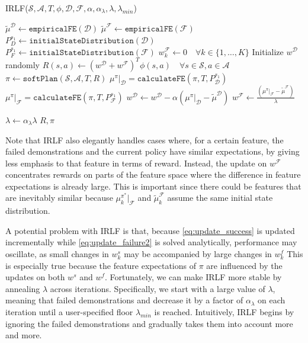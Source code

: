 \documentclass[letterpaper]{article}
\newcommand{\sw}[1]{\textcolor{red}{SW: #1}}
\newcommand{\jm}[1]{\textcolor{blue}{Joao: #1}}
\newcommand{\ks}[1]{\textcolor{green}{Kyriacos: #1}}
\newcommand{\sw}[1]{}
\newcommand{\jm}[1]{}
\newcommand{\ks}[1]{}
\begin{document}
\begin{algorithm}
\caption{IRLF($\mathcal{S},\mathcal{A},T, \phi, \mathcal{D}, \mathcal{F}, \alpha, \alpha_{\lambda}, \lambda, \lambda_{min}$) }
\label{alg:lff}
\begin{algorithmic}[1]
\STATE $\widetilde{\mu}^{\mathcal{D}} \gets \mathtt{empiricalFE}(\mathcal{D})$\hfill {}
\STATE $\widetilde{\mu}^{\mathcal{F}} \gets \mathtt{empiricalFE}(\mathcal{F})$ 
\STATE $P_{D}^{s_1} \gets \mathtt{initialStateDistribution}(\mathcal{D})$
\STATE $P_{F}^{s_1} \gets \mathtt{initialStateDistribution}(\mathcal{F})$
\STATE $w^{\mathcal{F}}_k\gets 0\quad\forall k\in\{1,\ldots,K\}$
\STATE Initialize $w^{\mathcal{D}}$ randomly
\REPEAT
\STATE $R(s,a) \gets (w^{\mathcal{D}}+w^{\mathcal{F}})^T\phi(s,a)\quad\forall s\in\mathcal{S},a\in\mathcal{A}$
\STATE $\pi \gets \mathtt{softPlan}(\mathcal{S},\mathcal{A},T,R)$\hfill{}
\STATE $\mu^\pi|_{\mathcal{D}} = \mathtt{calculateFE}(\pi,T,P_{\mathcal{D}}^{s_1})$
\STATE $\mu^\pi|_{\mathcal{F}} = \mathtt{calculateFE}(\pi,T,P_{\mathcal{F}}^{s_1})$
\STATE $w^{\mathcal{D}} \leftarrow w^{\mathcal{D}} - \alpha (\mu^\pi|_{\mathcal{D}} - \widetilde{\mu}^{\mathcal{D}})$
\STATE $w^{\mathcal{F}} \leftarrow \frac{(\mu^\pi|_{\mathcal{F}} - \widetilde{\mu}^{\mathcal{F}})}{\lambda}$

\STATE $\lambda \leftarrow \alpha_{\lambda}\lambda$
\ENDIF
{}
\RETURN $R,\pi$
\end{algorithmic}
\end{algorithm}

Note that IRLF also elegantly handles cases where, for a certain feature, the failed demonstrations and the current policy have similar expectations, by giving less emphasis to that feature in terms of reward. Instead, the update on $w^{\mathcal{F}}$ concentrates rewards on parts of the feature space where the difference in feature expectations is already large. This is important since there could be features that are inevitably similar because $\mu^{\pi^*}_k|_{\mathcal{F}}$ 
and $\widetilde{\mu}^{\mathcal{F}}_k$ assume the same initial state distribution.


A potential problem with IRLF is that, because \eqref{eq:update_success} is updated incrementally while \eqref{eq:update_failure2} is solved analytically, performance may oscillate, as small changes in $w^s_k$ may be accompanied by large changes in $w^f_k$ 
This is especially true because the feature expectations of $\pi$ are influenced by the updates on both $w^s$ and $w^f$. Fortunately, we can make IRLF more stable by annealing $\lambda$ across iterations.  Specifically, we start with a large value of $\lambda$, meaning that failed demonstrations and decrease it by a factor of $\alpha_{\lambda}$ 
on each iteration until a user-specified floor $\lambda_{min}$ 
is reached.  Intuitively, IRLF begins by ignoring the failed demonstrations and gradually takes them into account more and more.
\end{document}
